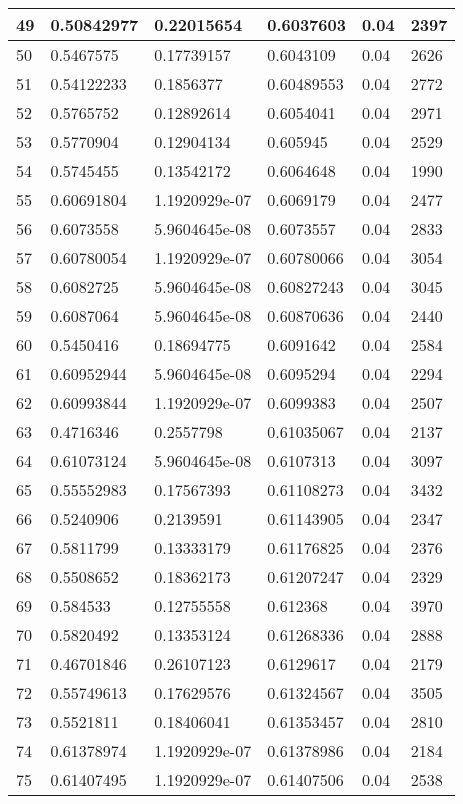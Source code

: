 \begin{longtable}{|l|l|l|l|l|l|}
49 & 0.50842977 & 0.22015654 & 0.6037603 & 0.04 & 2397 \\ \hline 
50 & 0.5467575 & 0.17739157 & 0.6043109 & 0.04 & 2626 \\ \hline 
51 & 0.54122233 & 0.1856377 & 0.60489553 & 0.04 & 2772 \\ \hline 
52 & 0.5765752 & 0.12892614 & 0.6054041 & 0.04 & 2971 \\ \hline 
53 & 0.5770904 & 0.12904134 & 0.605945 & 0.04 & 2529 \\ \hline 
54 & 0.5745455 & 0.13542172 & 0.6064648 & 0.04 & 1990 \\ \hline 
55 & 0.60691804 & 1.1920929e-07 & 0.6069179 & 0.04 & 2477 \\ \hline 
56 & 0.6073558 & 5.9604645e-08 & 0.6073557 & 0.04 & 2833 \\ \hline 
57 & 0.60780054 & 1.1920929e-07 & 0.60780066 & 0.04 & 3054 \\ \hline 
58 & 0.6082725 & 5.9604645e-08 & 0.60827243 & 0.04 & 3045 \\ \hline 
59 & 0.6087064 & 5.9604645e-08 & 0.60870636 & 0.04 & 2440 \\ \hline 
60 & 0.5450416 & 0.18694775 & 0.6091642 & 0.04 & 2584 \\ \hline 
61 & 0.60952944 & 5.9604645e-08 & 0.6095294 & 0.04 & 2294 \\ \hline 
62 & 0.60993844 & 1.1920929e-07 & 0.6099383 & 0.04 & 2507 \\ \hline 
63 & 0.4716346 & 0.2557798 & 0.61035067 & 0.04 & 2137 \\ \hline 
64 & 0.61073124 & 5.9604645e-08 & 0.6107313 & 0.04 & 3097 \\ \hline 
65 & 0.55552983 & 0.17567393 & 0.61108273 & 0.04 & 3432 \\ \hline 
66 & 0.5240906 & 0.2139591 & 0.61143905 & 0.04 & 2347 \\ \hline 
67 & 0.5811799 & 0.13333179 & 0.61176825 & 0.04 & 2376 \\ \hline 
68 & 0.5508652 & 0.18362173 & 0.61207247 & 0.04 & 2329 \\ \hline 
69 & 0.584533 & 0.12755558 & 0.612368 & 0.04 & 3970 \\ \hline 
70 & 0.5820492 & 0.13353124 & 0.61268336 & 0.04 & 2888 \\ \hline 
71 & 0.46701846 & 0.26107123 & 0.6129617 & 0.04 & 2179 \\ \hline 
72 & 0.55749613 & 0.17629576 & 0.61324567 & 0.04 & 3505 \\ \hline 
73 & 0.5521811 & 0.18406041 & 0.61353457 & 0.04 & 2810 \\ \hline 
74 & 0.61378974 & 1.1920929e-07 & 0.61378986 & 0.04 & 2184 \\ \hline 
75 & 0.61407495 & 1.1920929e-07 & 0.61407506 & 0.04 & 2538 \\ \hline 
\end{longtable}